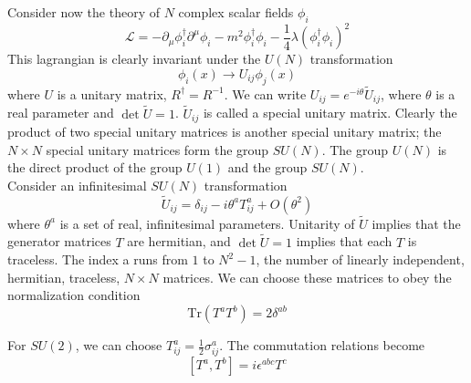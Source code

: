 \documentclass[cyan]{elegantnote}
\begin{document}
\noindent
Consider now the theory of $N$ complex scalar fields $\phi_i$
\[\mathcal{L} = -\partial_{\mu}\phi^{\dagger}_i \partial^{\mu}\phi_i - m^2\phi_i^{\dagger}\phi_i - \frac{1}{4}\lambda(\phi_i^{\dagger}\phi_i)^2\]
This lagrangian is clearly invariant under the $U(N)$ transformation
\[\phi_i(x) \to U_{ij}\phi_j(x)\]
where $U$ is a unitary matrix, $R^{\dagger} = R^{-1}$. We can write $U_{ij} = e^{-i\theta} \widetilde{U}_{ij}$, where $\theta$ is a real parameter and $\det \widetilde{U} = 1$.
$\widetilde{U}_{ij}$ is called a special unitary matrix.
Clearly the product of two special unitary matrices is another special unitary matrix; the $N \times N$ special unitary matrices form the group $SU(N)$. 
The group $U(N)$ is the direct product of the group $U(1)$ and the group $SU(N)$.\\
Consider an infinitesimal $SU(N)$ transformation
\[\widetilde{U}_{ij} = \delta_{ij} - i\theta^aT^a_{ij} + O(\theta^2)\]
where $\theta^a$ is a set of real, infinitesimal parameters. Unitarity of $\widetilde{U}$ implies that the generator matrices $T$ are hermitian, and $\det \widetilde{U} = 1$ implies that each $T$ is traceless.
The index a runs from $1$ to $N^2 - 1$, the number of linearly independent, hermitian, traceless, $N \times N$ matrices. We can choose these matrices to obey the normalization condition
\[\mathrm{Tr}(T^a T^b) =2\delta^{ab}\]

\begin{example}
For $SU(2)$, we can choose $T^a_{ij} = \frac{1}{2}\sigma^a_{ij}$. The commutation relations become
\[[T^a,T^b] = i\epsilon^{abc}T^c\]
\end{example}
\end{document}
